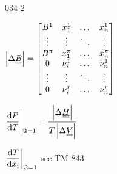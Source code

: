 \begin{mitframe}{034-2}

 	
    \begin{listone}
 
    	\item $\left|\iipf\uuline{\exergy}\right|=        
        \begin{bmatrix}
    	\exergy^{1} & \specfrac{1}^1 & \dots & \specfrac{n}^1 \\
    	\vdots & \vdots & \ddots & \vdots \\
        \exergy^{\pie} & \specfrac{1}^{\pie} & \dots & \specfrac{n}^{\pie} \\
        0 & \chargeval^{1} & \dots & \nu_{n}^1 \\
    	\vdots & \vdots & \ddots & \vdots \\
   	 	0 & \chargeval^{\pos} & \dots & \nu_{n}^{\pos} \\
		\end{bmatrix}
		$
        
        
        \item $\left.\dfrac{\mathrm{d}\p}{\mathrm{d}\Temp}\right|_{\dof=1} = \dfrac{\left|\iipf\uuline{\enthalpy}\right|}{\Temp\left|\iipf\uuline{\vol}\right|}$ 
        
        \item $\left.\dfrac{\mathrm{d}\Temp}{\mathrm{d}\specfrac{i}}\right|_{\dof=1}$ see TM 843
       
        
\end{listone}        
        
\end{mitframe}